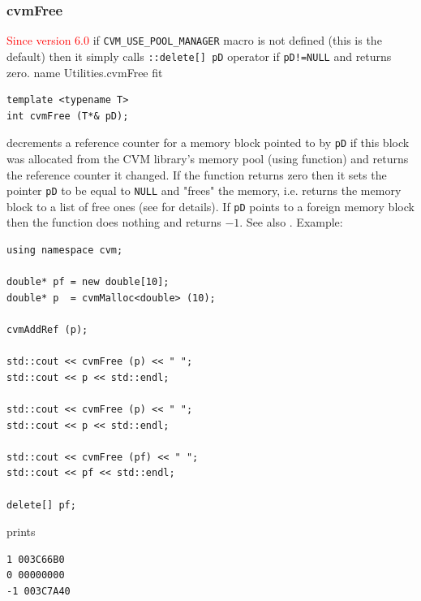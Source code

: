 \subsubsection{cvmFree}
\textcolor{red}{Since version 6.0} if \verb"CVM_USE_POOL_MANAGER" macro is not defined (this is the default)
then it simply calls \verb"::delete[] pD" operator if \verb"pD!=NULL" and returns zero.%
\pdfdest name {Utilities.cvmFree} fit
\begin{verbatim}
template <typename T>
int cvmFree (T*& pD);
\end{verbatim}
decrements a reference counter for a memory block pointed to
by \verb"pD" if this block was allocated from the CVM library's
memory pool (using  function)
and returns the reference counter it changed.
If the function returns zero then it sets the pointer
\verb"pD" to be equal to \verb"NULL" and "frees" the memory, i.e.
returns the memory block to a list of free ones (see  for details).
If \verb"pD" points to a foreign memory block then
the function does nothing and returns $-1$.
See also .
Example:
\begin{Verbatim}
using namespace cvm;

double* pf = new double[10];
double* p  = cvmMalloc<double> (10);

cvmAddRef (p);

std::cout << cvmFree (p) << " ";
std::cout << p << std::endl;

std::cout << cvmFree (p) << " ";
std::cout << p << std::endl;

std::cout << cvmFree (pf) << " ";
std::cout << pf << std::endl;

delete[] pf;
\end{Verbatim}
prints
\begin{Verbatim}
1 003C66B0
0 00000000
-1 003C7A40
\end{Verbatim}
\newpage





